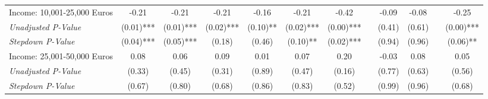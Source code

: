 \begin{tabular}{l c c c c c c c c c c c}
Income: 10,001-25,000 Euros & -0.21 & -0.21 & -0.21 & -0.16 & -0.21 & -0.42 & & -0.09 & -0.08 & & -0.25 \\
\quad \textit{Unadjusted P-Value} & (0.01)*** & (0.01)*** & (0.02)*** & (0.10)** & (0.02)*** & (0.00)*** & & (0.41) & (0.61) & & (0.00)*** \\
\quad \textit{Stepdown P-Value} & (0.04)*** & (0.05)*** & (0.18) & (0.46) & (0.10)** & (0.02)*** & & (0.94) & (0.96) & & (0.06)** \\
Income: 25,001-50,000 Euros & 0.08 & 0.06 & 0.09 & 0.01 & 0.07 & 0.20 & & -0.03 & 0.08 & & 0.05 \\
\quad \textit{Unadjusted P-Value} & (0.33) & (0.45) & (0.31) & (0.89) & (0.47) & (0.16) & & (0.77) & (0.63) & & (0.56) \\
\quad \textit{Stepdown P-Value} & (0.67) & (0.80) & (0.68) & (0.86) & (0.83) & (0.52) & & (0.99) & (0.96) & & (0.68) \\
\bottomrule
\end{tabular}
